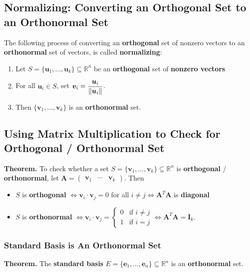 \documentclass[../ma2001_notes.tex]{subfiles}
\begin{document}
\subsection{Normalizing: Converting an Orthogonal Set to an Orthonormal Set}
The following process of converting an \textbf{orthogonal} set of nonzero vectors to an \textbf{orthonormal} set of vectors, is called \textbf{normalizing}:
\begin{enumerate}
	\item Let \(S=\{\bm{u}_1,\ldots,\bm{u}_k\}\subseteq\mathbb{R}^n\) be an \textbf{orthogonal} set of \textbf{nonzero vectors}
	\item For all \(\bm{u}_i\in S\), set \(\displaystyle\bm{v}_i=\frac{\bm{u}_i}{\lVert\bm{u}_i\rVert}\).
	\item Then \(\{\bm{v}_1,\ldots,\bm{v}_k\}\) is an \textbf{orthonormal} set.
\end{enumerate}

\subsection{Using Matrix Multiplication to Check for Orthogonal / Orthonormal Set}
\textbf{Theorem.} To check whether a set \(S=\{\bm{v}_1,\ldots,\bm{v}_k\}\subseteq\mathbb{R}^n\) is \textbf{orthogonal} / \textbf{orthonormal}, let \(\bm{A}=\begin{pmatrix}
	\bm{v}_1 & \cdots & \bm{v}_k
\end{pmatrix}\). Then
\begin{itemize}
	\item\(S\) is \textbf{orthogonal} \(\Leftrightarrow\bm{v}_i\cdot\bm{v}_j=0\) for all \(i\ne j\Leftrightarrow\bm{A}^T\bm{A}\) is \textbf{diagonal}
	\item\(S\) is \textbf{orthonormal} \(\Leftrightarrow\bm{v}_i\cdot\bm{v}_j=\begin{cases}
	0 & \text{if }i\ne j \\
	1 & \text{if }i=j
\end{cases}\Leftrightarrow\bm{A}^T\bm{A}=\bm{I}_k\).
\end{itemize}

\subsubsection{Standard Basis is An Orthonormal Set}
\textbf{Theorem.} The \textbf{standard basis} \(E=\{\bm{e}_1,\ldots,\bm{e}_n\}\subseteq\mathbb{R}^n\) is an \textbf{orthonormal} set.
\end{document}
